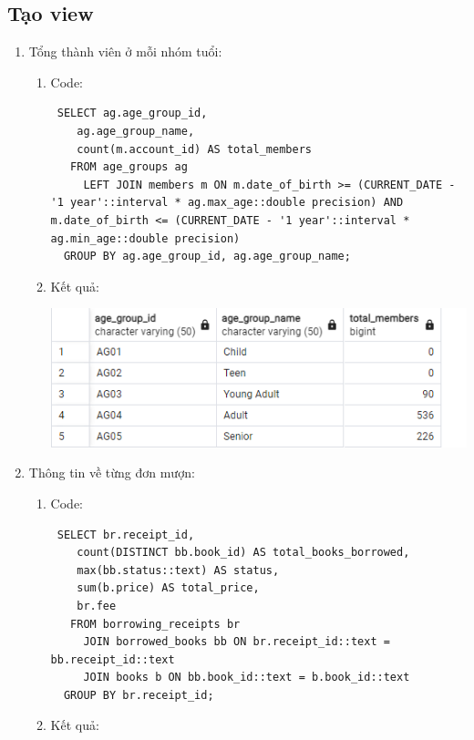 \documentclass[12pt]{article}
\begin{document}
\subsection{Tạo view}
\begin{enumerate}
    \item Tổng thành viên ở mỗi nhóm tuổi:
    \begin{enumerate}
        \item Code:
        \begin{lstlisting}
 SELECT ag.age_group_id,
    ag.age_group_name,
    count(m.account_id) AS total_members
   FROM age_groups ag
     LEFT JOIN members m ON m.date_of_birth >= (CURRENT_DATE - '1 year'::interval * ag.max_age::double precision) AND m.date_of_birth <= (CURRENT_DATE - '1 year'::interval * ag.min_age::double precision)
  GROUP BY ag.age_group_id, ag.age_group_name;
        \end{lstlisting}
        \item Kết quả:

        \includegraphics[width=0.95\linewidth]{Screenshot 2024-06-22 183721.png}
    \end{enumerate}
    \item Thông tin về từng đơn mượn:
    \begin{enumerate}
        \item Code:
        \begin{lstlisting}
 SELECT br.receipt_id,
    count(DISTINCT bb.book_id) AS total_books_borrowed,
    max(bb.status::text) AS status,
    sum(b.price) AS total_price,
    br.fee
   FROM borrowing_receipts br
     JOIN borrowed_books bb ON br.receipt_id::text = bb.receipt_id::text
     JOIN books b ON bb.book_id::text = b.book_id::text
  GROUP BY br.receipt_id;
        \end{lstlisting}
        \item Kết quả:


\end{enumerate}
\end{enumerate}
\end{document}
